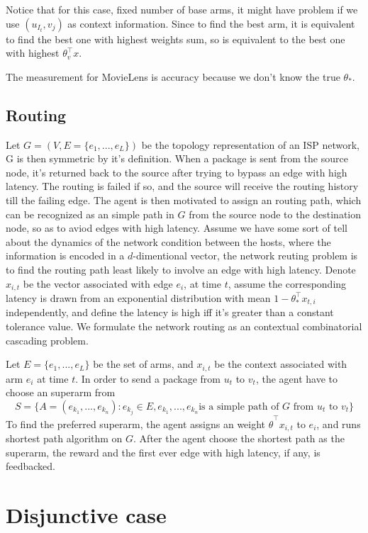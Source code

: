 \documentclass[a4paper,11pt]{article}
\begin{document}
Notice that for this case, fixed number of base arms, it might have problem if we use $(u_{I_t}, v_j)$ as context information.
Since to find the best arm, it is equivalent to find the best one with highest weights sum, so is equivalent to the best one with highest $\theta_{v}^{\top}x$.

The measurement for MovieLens is accuracy because we don't know the true $\theta_{\ast}$.

\subsection{Routing}

Let $G=(V,E=\{e_1,...,e_L\})$ be the topology representation of an ISP network, G is then symmetric by it's definition. 
When a package is sent from the source node, it's returned back to the source after trying to bypass an edge with high latency.
The routing is failed if so, and the source will receive the routing history till the failing edge.
The agent is then motivated to assign an routing path, which can be recognized as an simple path in $G$ from the source node to the destination node, so as to aviod edges with high latency. 
Assume we have some sort of tell about the dynamics of the network condition between the hosts, where the information is encoded in a $d$-dimentional vector, the network reuting problem is to find the routing path least likely to involve an edge with high latency.
Denote $x_{i,t}$ be the vector associated with edge $e_i$, at time $t$, assume the corresponding latency is drawn from an exponential distribution with mean $1 - \theta_{\ast}^{\top}x_{t,i}$ independently,
and define the latency is high iff it's greater than a constant tolerance value.
We formulate the network routing as an contextual combinatorial cascading problem.

Let $E=\{e_1,...,e_L\}$ be the set of arms, and $x_{i,t}$ be the context associated with arm $e_i$ at time $t$.
In order to send a package from $u_t$ to $v_t$,
the agent have to choose an superarm from $$S=\{A=(e_{k_1},...,e_{k_n}):e_{k_j}\in E, e_{k_1},...,e_{k_n} \text{is a simple path of } G \text{ from } u_t \text{ to } v_t\}$$
To find the preferred superarm, the agent assigns an weight $\hat{\theta}^{\top}x_{i,t}$ to $e_i$, and runs shortest path algorithm on $G$.
After the agent choose the shortest path as the superarm, the reward and the first ever edge with high latency, if any, is feedbacked.

\section{Disjunctive case}
\end{document}
